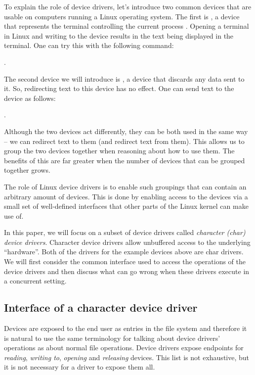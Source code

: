 \documentclass[..thesis.tex]{subfiles}
\begin{document}

To explain the role of device drivers, let's introduce two common devices that are usable on computers running a Linux operating system.
The first is , a device that represents the terminal controlling the current process \cite{torvalds_linux}.
Opening a terminal in Linux and writing to the device results in the text being displayed in the terminal. One can try this with the following command: 

.
 
The second device we will introduce is , a device that discards any data sent to it. So, redirecting text to this device has no effect.
One can send text to the device as follows:

.

Although the two devices act differently, they can be both used in the same way -- we can redirect text to them (and redirect text from them).
This allows us to group the two devices together when reasoning about how to use them. The benefits of this are far greater when the number of devices that can be grouped together grows.

The role of Linux device drivers is to enable such groupings that can contain an arbitrary amount of devices.
This is done by enabling access to the devices via a small set of well-defined interfaces that other parts of the Linux kernel can make use of. 

In this paper, we will focus on a subset of device drivers called \textit{character (char) device drivers}.
Character device drivers allow unbuffered access to the underlying ``hardware''.
Both of the drivers for the example devices above are char drivers. We will
first consider the common interface used to access the operations of the device
drivers and then discuss what can go wrong when these drivers execute in a concurrent setting.

\subsection{Interface of a character device driver}

Devices are exposed to the end user as entries in the file system and therefore it is natural
to use the same terminology for talking about device drivers' operations as about normal file operations.
Device drivers expose endpoints for \textit{reading}, \textit{writing to}, \textit{opening} and \textit{releasing} devices.
This list is not exhaustive\cite[include/linux/fs.h]{torvalds_linux}, but it is not necessary for a driver to expose them all.
\end{document}
